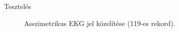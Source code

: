 \documentclass{beamer}
\begin{document}
\begin{frame}{Tesztelés}
{\begin{figure}[htb!]
\caption{Asszimetrikus EKG jel közelítése (119-es rekord).}
\end{figure}
}
\end{frame}
\end{document}

